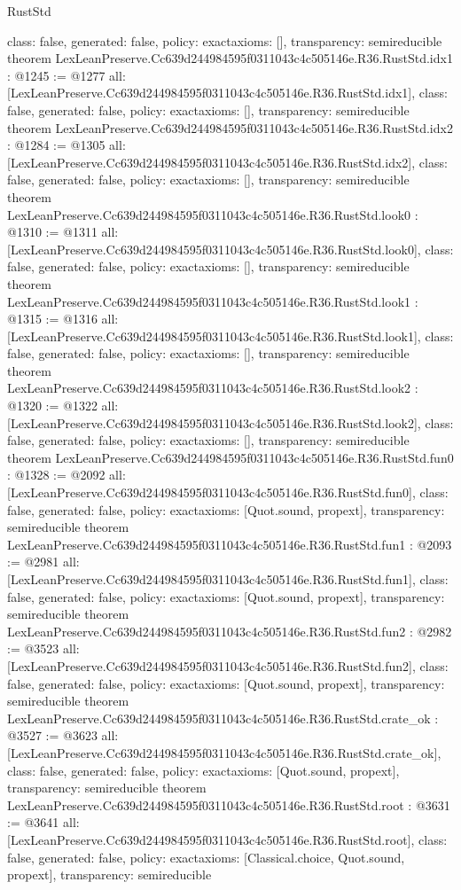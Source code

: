 \begin{lexlean}{RustStd}
\begin{coremodule}
{  class: false,
  generated: false,
  policy: exact{axioms: []},
  transparency: semireducible
}
theorem LexLeanPreserve.Cc639d244984595f0311043c4c505146e.R36.RustStd.idx1 : @1245 := @1277 {
  all: [LexLeanPreserve.Cc639d244984595f0311043c4c505146e.R36.RustStd.idx1],
  class: false,
  generated: false,
  policy: exact{axioms: []},
  transparency: semireducible
}
theorem LexLeanPreserve.Cc639d244984595f0311043c4c505146e.R36.RustStd.idx2 : @1284 := @1305 {
  all: [LexLeanPreserve.Cc639d244984595f0311043c4c505146e.R36.RustStd.idx2],
  class: false,
  generated: false,
  policy: exact{axioms: []},
  transparency: semireducible
}
theorem LexLeanPreserve.Cc639d244984595f0311043c4c505146e.R36.RustStd.look0 : @1310 := @1311 {
  all: [LexLeanPreserve.Cc639d244984595f0311043c4c505146e.R36.RustStd.look0],
  class: false,
  generated: false,
  policy: exact{axioms: []},
  transparency: semireducible
}
theorem LexLeanPreserve.Cc639d244984595f0311043c4c505146e.R36.RustStd.look1 : @1315 := @1316 {
  all: [LexLeanPreserve.Cc639d244984595f0311043c4c505146e.R36.RustStd.look1],
  class: false,
  generated: false,
  policy: exact{axioms: []},
  transparency: semireducible
}
theorem LexLeanPreserve.Cc639d244984595f0311043c4c505146e.R36.RustStd.look2 : @1320 := @1322 {
  all: [LexLeanPreserve.Cc639d244984595f0311043c4c505146e.R36.RustStd.look2],
  class: false,
  generated: false,
  policy: exact{axioms: []},
  transparency: semireducible
}
theorem LexLeanPreserve.Cc639d244984595f0311043c4c505146e.R36.RustStd.fun0 : @1328 := @2092 {
  all: [LexLeanPreserve.Cc639d244984595f0311043c4c505146e.R36.RustStd.fun0],
  class: false,
  generated: false,
  policy: exact{axioms: [Quot.sound, propext]},
  transparency: semireducible
}
theorem LexLeanPreserve.Cc639d244984595f0311043c4c505146e.R36.RustStd.fun1 : @2093 := @2981 {
  all: [LexLeanPreserve.Cc639d244984595f0311043c4c505146e.R36.RustStd.fun1],
  class: false,
  generated: false,
  policy: exact{axioms: [Quot.sound, propext]},
  transparency: semireducible
}
theorem LexLeanPreserve.Cc639d244984595f0311043c4c505146e.R36.RustStd.fun2 : @2982 := @3523 {
  all: [LexLeanPreserve.Cc639d244984595f0311043c4c505146e.R36.RustStd.fun2],
  class: false,
  generated: false,
  policy: exact{axioms: [Quot.sound, propext]},
  transparency: semireducible
}
theorem LexLeanPreserve.Cc639d244984595f0311043c4c505146e.R36.RustStd.crate_ok : @3527 := @3623 {
  all: [LexLeanPreserve.Cc639d244984595f0311043c4c505146e.R36.RustStd.crate_ok],
  class: false,
  generated: false,
  policy: exact{axioms: [Quot.sound, propext]},
  transparency: semireducible
}
theorem LexLeanPreserve.Cc639d244984595f0311043c4c505146e.R36.RustStd.root : @3631 := @3641 {
  all: [LexLeanPreserve.Cc639d244984595f0311043c4c505146e.R36.RustStd.root],
  class: false,
  generated: false,
  policy: exact{axioms: [Classical.choice, Quot.sound, propext]},
  transparency: semireducible
}


\end{coremodule}
\end{lexlean}
